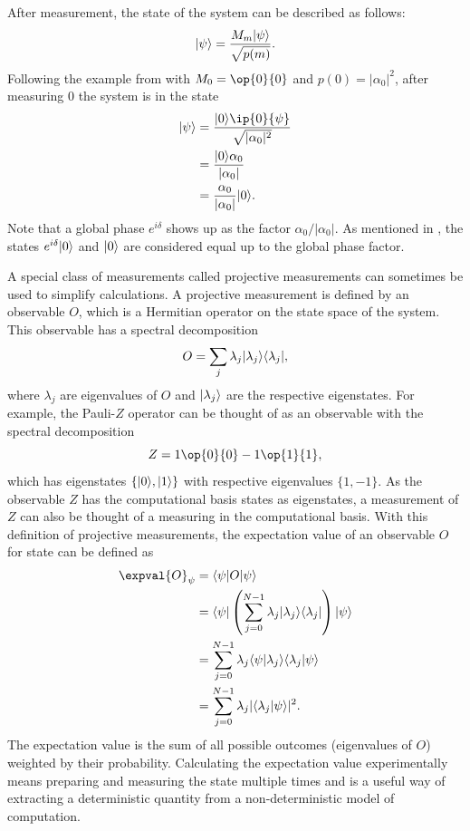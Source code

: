 After measurement, the state of the system can be described as follows:
\begin{equation}
\vert{\psi}\rangle = \dfrac{M_m\vert{\psi}\rangle}{\sqrt{p(m)}}.
\end{equation}
Following the example from  with $M_0 = \op{0}{0}$ and $p(0) = |\alpha_0|^2$, after measuring 0 the system is in the state
\begin{equation}
\begin{aligned}
\ket{\psi} &= \dfrac{\ket{0}\ip{0}{\psi}}{\sqrt{|\alpha_0|^2}} \\
&= \dfrac{\ket{0}\alpha_0}{|\alpha_0|} \\
&= \dfrac{\alpha_0}{|\alpha_0|} \ket{0}.
\end{aligned}
\end{equation}
Note that a global phase $e^{i\delta}$ shows up as the factor $\alpha_0/|\alpha_0|$.
As mentioned in , the states $e^{i\delta}\vert{0}\rangle$ and $\vert{0}\rangle$ are considered equal up to the global phase factor.

A special class of measurements called projective measurements can sometimes be used to simplify calculations.
A projective measurement is defined by an observable $O$, which is a Hermitian operator on the state space of the system.
This observable has a spectral decomposition
\begin{equation}
O = \sum_{j}\lambda_j \vert{\lambda_j}\rangle\langle{\lambda_j}\vert,
\end{equation}
where $\lambda_j$ are eigenvalues of $O$ and $\vert{\lambda_j}\rangle$ are the respective eigenstates.
For example, the Pauli-$Z$ operator can be thought of as an observable with the spectral decomposition
\begin{equation}
Z = 1\op{0}{0} - 1\op{1}{1},
\end{equation}
which has eigenstates $\{\vert{0}\rangle, \vert{1}\rangle\}$ with respective eigenvalues $\{1, -1\}$.
As the observable $Z$ has the computational basis states as eigenstates, a measurement of $Z$ can also be thought of a measuring in the computational basis.
With this definition of projective measurements, the expectation value of an observable $O$ for state \ket{\psi} can be defined as
\begin{equation}
\begin{aligned}
\expval{O}_\psi &= \bra{\psi}O\ket{\psi} \\
&= \bra{\psi}\left(\sum_{j=0}^{N-1}\lambda_j \vert\lambda_j\rangle \langle\lambda_j\vert \right)\ket{\psi} \\
&= \sum_{j=0}^{N-1}\lambda_j \langle \psi | \lambda_j\rangle \langle \lambda_j \vert \psi \rangle \\
&= \sum_{j=0}^{N-1}\lambda_j \vert\langle\lambda_j \vert \psi\rangle \rvert^2.
\end{aligned}
\end{equation}
The expectation value is the sum of all possible outcomes (eigenvalues of $O$) weighted by their probability.
Calculating the expectation value experimentally means preparing and measuring the state multiple times and is a useful way of extracting a deterministic quantity from a non-deterministic model of computation.

